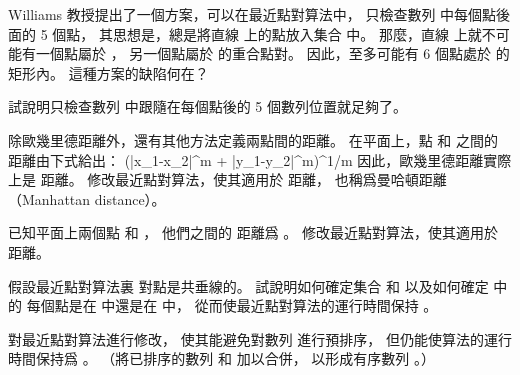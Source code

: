 \startsection[
  title={Finding the closest pair of points},
]

\startEXERCISE
Williams 教授提出了一個方案，可以在最近點對算法中，
只檢查數列  中每個點後面的 5 個點，
其思想是，總是將直線  上的點放入集合  中。
那麼，直線  上就不可能有一個點屬於 ，
另一個點屬於  的重合點對。
因此，至多可能有 6 個點處於 \m{\delta\times 2\delta} 的矩形內。
這種方案的缺陷何在？
\stopEXERCISE

\startANSWER
{}
\stopANSWER

\startEXERCISE
試說明只檢查數列  中跟隨在每個點後的 5 個數列位置就足夠了。
\stopEXERCISE

\startANSWER
{}
\stopANSWER

\startEXERCISE
除歐幾里德距離外，還有其他方法定義兩點間的距離。
在平面上，點  和  之間的{\EMP {} 距離}由下式給出：
\startformula
(|x_1-x_2|^m + |y_1-y_2|^m)^{1/m}
\stopformula
因此，歐幾里德距離實際上是  距離。
修改最近點對算法，使其適用於  距離，
也稱爲{\EMP 曼哈頓距離}（Manhattan distance）。
\stopEXERCISE

\startANSWER
{}
\stopANSWER

\startEXERCISE
已知平面上兩個點  和 ，
他們之間的  距離爲 。
修改最近點對算法，使其適用於  距離。
\stopEXERCISE

\startANSWER
{}
\stopANSWER

\startEXERCISE
假設最近點對算法裏  對點是共垂線的。
試說明如何確定集合  和  以及如何確定  中的
每個點是在  中還是在  中，
從而使最近點對算法的運行時間保持 。
\stopEXERCISE

\startANSWER
{}
\stopANSWER

\startEXERCISE
對最近點對算法進行修改，
使其能避免對數列  進行預排序，
但仍能使算法的運行時間保持爲 。
（\hint 將已排序的數列  和  加以合併，
以形成有序數列 。）
\stopEXERCISE

\startANSWER
{}
\stopANSWER

\stopsection
